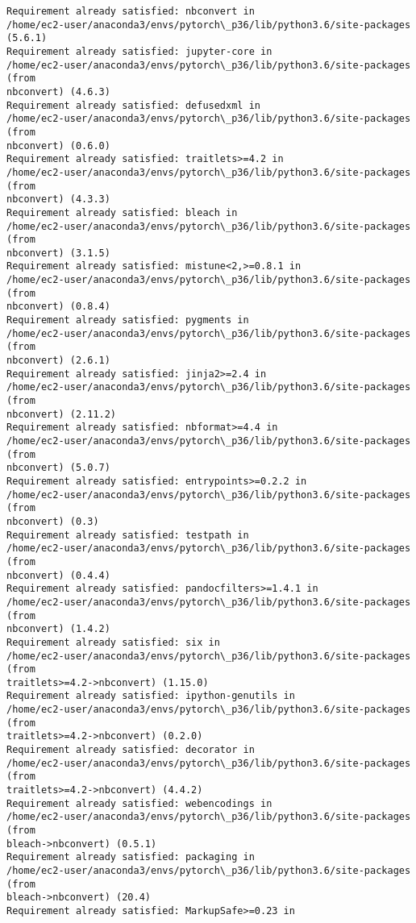 \documentclass[11pt]{article}
\begin{document}
    \begin{Verbatim}[commandchars=\\\{\}]
Requirement already satisfied: nbconvert in
/home/ec2-user/anaconda3/envs/pytorch\_p36/lib/python3.6/site-packages (5.6.1)
Requirement already satisfied: jupyter-core in
/home/ec2-user/anaconda3/envs/pytorch\_p36/lib/python3.6/site-packages (from
nbconvert) (4.6.3)
Requirement already satisfied: defusedxml in
/home/ec2-user/anaconda3/envs/pytorch\_p36/lib/python3.6/site-packages (from
nbconvert) (0.6.0)
Requirement already satisfied: traitlets>=4.2 in
/home/ec2-user/anaconda3/envs/pytorch\_p36/lib/python3.6/site-packages (from
nbconvert) (4.3.3)
Requirement already satisfied: bleach in
/home/ec2-user/anaconda3/envs/pytorch\_p36/lib/python3.6/site-packages (from
nbconvert) (3.1.5)
Requirement already satisfied: mistune<2,>=0.8.1 in
/home/ec2-user/anaconda3/envs/pytorch\_p36/lib/python3.6/site-packages (from
nbconvert) (0.8.4)
Requirement already satisfied: pygments in
/home/ec2-user/anaconda3/envs/pytorch\_p36/lib/python3.6/site-packages (from
nbconvert) (2.6.1)
Requirement already satisfied: jinja2>=2.4 in
/home/ec2-user/anaconda3/envs/pytorch\_p36/lib/python3.6/site-packages (from
nbconvert) (2.11.2)
Requirement already satisfied: nbformat>=4.4 in
/home/ec2-user/anaconda3/envs/pytorch\_p36/lib/python3.6/site-packages (from
nbconvert) (5.0.7)
Requirement already satisfied: entrypoints>=0.2.2 in
/home/ec2-user/anaconda3/envs/pytorch\_p36/lib/python3.6/site-packages (from
nbconvert) (0.3)
Requirement already satisfied: testpath in
/home/ec2-user/anaconda3/envs/pytorch\_p36/lib/python3.6/site-packages (from
nbconvert) (0.4.4)
Requirement already satisfied: pandocfilters>=1.4.1 in
/home/ec2-user/anaconda3/envs/pytorch\_p36/lib/python3.6/site-packages (from
nbconvert) (1.4.2)
Requirement already satisfied: six in
/home/ec2-user/anaconda3/envs/pytorch\_p36/lib/python3.6/site-packages (from
traitlets>=4.2->nbconvert) (1.15.0)
Requirement already satisfied: ipython-genutils in
/home/ec2-user/anaconda3/envs/pytorch\_p36/lib/python3.6/site-packages (from
traitlets>=4.2->nbconvert) (0.2.0)
Requirement already satisfied: decorator in
/home/ec2-user/anaconda3/envs/pytorch\_p36/lib/python3.6/site-packages (from
traitlets>=4.2->nbconvert) (4.4.2)
Requirement already satisfied: webencodings in
/home/ec2-user/anaconda3/envs/pytorch\_p36/lib/python3.6/site-packages (from
bleach->nbconvert) (0.5.1)
Requirement already satisfied: packaging in
/home/ec2-user/anaconda3/envs/pytorch\_p36/lib/python3.6/site-packages (from
bleach->nbconvert) (20.4)
Requirement already satisfied: MarkupSafe>=0.23 in

\end{Verbatim}
\end{document}
